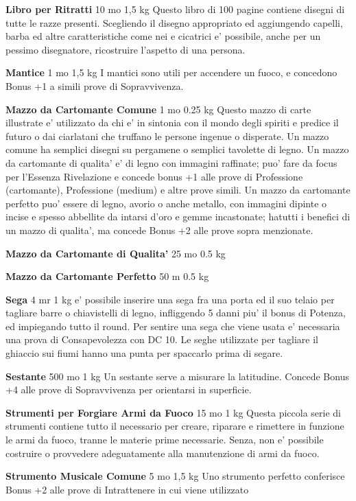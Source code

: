 \documentclass[a4paper,11pt,twoside,openany]{dndbook}
\begin{document}
{\textbf{Libro per Ritratti} 10 mo 1,5 kg Questo libro di 100 pagine contiene disegni di tutte le razze presenti. Scegliendo il disegno appropriato ed aggiungendo capelli, barba ed altre caratteristiche come nei e cicatrici e' possibile, anche per un pessimo disegnatore, ricostruire l'aspetto di una persona.

\textbf{Mantice} 1 mo 1,5 kg I mantici sono utili per accendere un fuoco, e concedono Bonus +1 a simili prove di Sopravvivenza.

\textbf{Mazzo da Cartomante Comune} 1 mo 0.25 kg Questo mazzo di carte illustrate e' utilizzato da chi e' in sintonia con il mondo degli spiriti e predice il futuro o dai ciarlatani che truffano le persone ingenue o disperate. Un mazzo comune ha semplici disegni su pergamene o semplici tavolette di legno. Un mazzo da cartomante di qualita' e' di legno con immagini raffinate; puo' fare da focus per l'Essenza Rivelazione e concede bonus +1 alle prove di Professione (cartomante), Professione (medium) e altre prove simili. Un mazzo da cartomante perfetto puo' essere di legno, avorio o anche metallo, con immagini dipinte o incise e spesso abbellite da intarsi d'oro e gemme incastonate; hatutti i benefici di un mazzo di qualita', ma concede Bonus +2 alle prove sopra menzionate.

\textbf{Mazzo da Cartomante di Qualita'} 25 mo 0.5 kg

\textbf{Mazzo da Cartomante Perfetto} 50 m 0.5 kg

\textbf{Sega} 4 mr 1 kg e' possibile inserire una sega fra una porta ed il suo telaio per tagliare barre o chiavistelli di legno, infliggendo 5 danni piu' il bonus di Potenza, ed impiegando tutto il round. Per sentire una sega che viene usata e' necessaria una prova di Consapevolezza con DC 10. Le seghe utilizzate per tagliare il ghiaccio sui fiumi hanno una punta per spaccarlo prima di segare.

\textbf{Sestante} 500 mo 1 kg Un sestante serve a misurare la latitudine. Concede Bonus +4 alle prove di Sopravvivenza per orientarsi in superficie.

\textbf{Strumenti per Forgiare Armi da Fuoco} 15 mo 1 kg Questa piccola serie di strumenti contiene tutto il necessario per creare, riparare e rimettere in funzione le armi da fuoco, tranne le materie prime necessarie. Senza, non e' possibile costruire o provvedere adeguatamente alla manutenzione di armi da fuoco.

\textbf{Strumento Musicale Comune} 5 mo 1,5 kg Uno strumento perfetto conferisce Bonus +2 alle prove di Intrattenere in cui viene utilizzato

}
\end{document}
